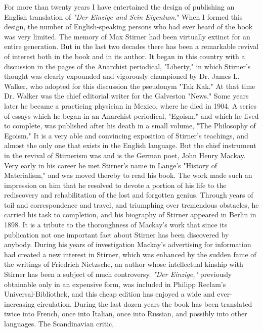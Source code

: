 \documentclass[a4paper]{book}
\begin{document}
For more than twenty years I have entertained the design of publishing an 
English translation of \textit{"{}Der Einzige und Sein Eigentum}."{} When I 
formed this design, the number of English-speaking persons who had ever heard 
of the book was very limited. The memory of Max Stirner had been virtually 
extinct for an entire generation. But in the last two decades there has been a 
remarkable revival of interest both in the book and in its author. It began in 
this country with a discussion in the pages of the Anarchist periodical, 
"{}Liberty,"{} in which Stirner's thought was clearly expounded and vigorously 
championed by Dr. James L. Walker, who adopted for this discussion the 
pseudonym "{}Tak Kak."{} At that time Dr. Walker was the chief editorial 
writer for the Galveston "{}News."{} Some years later he became a practicing 
physician in Mexico, where he died in 1904. A series of essays which he began 
in an Anarchist periodical, "{}Egoism,"{} and which he lived to complete, was 
published after his death in a small volume, "{}The Philosophy of Egoism."{} 
It is a very able and convincing exposition of Stirner's teachings, and almost 
the only one that exists in the English language. But the chief instrument in 
the revival of Stirnerism was and is the German poet, John Henry Mackay. Very 
early in his career he met Stirner's name in Lange's "{}History of 
Materialism,"{} and was moved thereby to read his book. The work made such an 
impression on him that he resolved to devote a portion of his life to the 
rediscovery and rehabilitation of the lost and forgotten genius. Through years 
of toil and correspondence and travel, and triumphing over tremendous 
obstacles, he carried his task to completion, and his biography of Stirner 
appeared in Berlin in 1898. It is a tribute to the thoroughness of Mackay's 
work that since its publication not one important fact about Stirner has been 
discovered by anybody. During his years of investigation Mackay's advertising 
for information had created a new interest in Stirner, which was enhanced by 
the sudden fame of the writings of Friedrich Nietzsche, an author whose 
intellectual kinship with Stirner has been a subject of much controversy. 
\textit{"{}Der Einzige,"{}} previously obtainable only in an expensive form, 
was included in Philipp Reclam's Universal-Bibliothek, and this cheap edition 
has enjoyed a wide and ever-increasing circulation. During the last dozen 
years the book has been translated twice into French, once into Italian, once 
into Russian, and possibly into other languages. The Scandinavian critic, 
\end{document}
